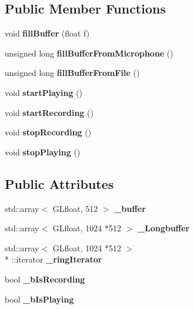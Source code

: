\subsection*{Public Member Functions}
\begin{DoxyCompactItemize}
\item 
void {\bfseries fill\-Buffer} (float f)\label{classSoundfieldViewer_1_1SignalProvider_a61a9f0145d3f2e23bf28bf906189aed6}

\item 
unsigned long {\bfseries fill\-Buffer\-From\-Microphone} ()\label{classSoundfieldViewer_1_1SignalProvider_ac7a4cb25a924f864a0bc843cac3528a0}

\item 
unsigned long {\bfseries fill\-Buffer\-From\-File} ()\label{classSoundfieldViewer_1_1SignalProvider_ad61507ea2c42f5431d85f04b6b443348}

\item 
void {\bfseries start\-Playing} ()\label{classSoundfieldViewer_1_1SignalProvider_a4e4529ba443fa00e89989d7f3076dd67}

\item 
void {\bfseries start\-Recording} ()\label{classSoundfieldViewer_1_1SignalProvider_a3f5e7c1065bb65d2a19669cafd63e69b}

\item 
void {\bfseries stop\-Recording} ()\label{classSoundfieldViewer_1_1SignalProvider_ac63d6be874ff6e47c065f5536f04f8b2}

\item 
void {\bfseries stop\-Playing} ()\label{classSoundfieldViewer_1_1SignalProvider_ae98cd9c8da45cc98a717f45b2c6833d2}

\end{DoxyCompactItemize}
\subsection*{Public Attributes}
\begin{DoxyCompactItemize}
\item 
std\-::array$<$ G\-Lfloat, 512 $>$ {\bfseries \-\_\-buffer}\label{classSoundfieldViewer_1_1SignalProvider_adbaa5fa3081497667dff0afd9a3ca58f}

\item 
std\-::array$<$ G\-Lfloat, 1024 $\ast$512 $>$ {\bfseries \-\_\-\-Longbuffer}\label{classSoundfieldViewer_1_1SignalProvider_af233dfdbc86f497eb89212b589bf3363}

\item 
std\-::array$<$ G\-Lfloat, 1024 $\ast$512 $>$\\*
\-::iterator {\bfseries \-\_\-ring\-Iterator}\label{classSoundfieldViewer_1_1SignalProvider_abe3b620ca38f49273eb0bdc9477fee50}

\item 
bool {\bfseries \-\_\-b\-Is\-Recording}\label{classSoundfieldViewer_1_1SignalProvider_af2207cc700cf00547b198c06d7cd3078}

\item 
bool {\bfseries \-\_\-b\-Is\-Playing}\label{classSoundfieldViewer_1_1SignalProvider_abd827c9636f59c370ba127f46384a30b}

\end{DoxyCompactItemize}
